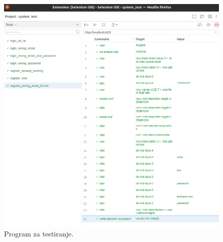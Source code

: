            \begin{figure}[H]
                \includegraphics[width=\textwidth]{slike/tests_system/register_wrong_format.png} %
                \caption{Program za testiranje.}
                \label{fig:struktura} %
            \end{figure}

